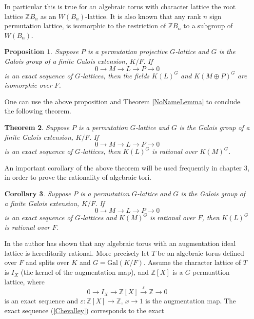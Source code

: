 \documentclass[a4paper, 14pt]{extarticle}
\theoremstyle{plain}
\newtheorem{theorem}{Theorem}
\newtheorem{corollary}[theorem]{Corollary}
\newtheorem{proposition}[theorem]{Proposition}
\theoremstyle{definition}
\newcommand{\Z}{\ensuremath{\mathbb{Z}}}
\begin{document}
In particular this is true for an algebraic torus with character lattice the root 
lattice $\Z B_n$ as an $W(B_n)$-lattice. It is also known that any rank $n$ sign 
permutation lattice, is isomorphic to the restriction of $\Z B_n$ to a subgroup 
of $W(B_n)$. 
\begin{proposition}\cite[Proposition 1.5]{Lenstra}
Suppose $P$ is a permutation projective $G$-lattice and $G$ is the Galois group 
of a finite Galois extension, $K/F$. If 
$$0 \longrightarrow M \longrightarrow L \longrightarrow P \longrightarrow 0 $$ is 
an exact sequence of $G$-lattices, then the fields $K(L)^G$ and $K(M \oplus P)^G$ are isomorphic over $F$. 
\end{proposition}
\noindent
One can use the above proposition and Theorem \ref{NoNameLemma} to conclude the 
following theorem.
\begin{theorem}\cite[Proposition 1.6]{Lenstra}\label{method2}
Suppose $P$ is a permutation $G$-lattice and $G$ is the Galois group of a finite 
Galois extension, $K/F$.  If 
$$0 \longrightarrow M \longrightarrow L \longrightarrow P \longrightarrow 0 $$ is 
an exact sequence of $G$-lattices, then $K(L)^G$ is rational over $K(M)^G$.
\end{theorem}
\noindent
An important corollary of the above theorem will be used frequently in chapter 3, 
in order to prove the rationality of algebraic tori.
\begin{corollary}\label{permcoker}
Suppose $P$ is a permutation $G$-lattice and $G$ is the Galois group of a finite 
Galois extension, $K/F$.  If $$0 \longrightarrow M \longrightarrow L \longrightarrow P \longrightarrow 0 $$ 
is an exact sequence of $G$-lattices and $K(M)^G$ is rational over $F$, then $K(L)^G$ is rational over $F$.
\end{corollary}
\noindent
In \cite[Section 2.4.8]{Voskresenskii} the author has shown that any algebraic 
torus with an augmentation ideal lattice is hereditarily rational. More precisely 
let $T$ be an algebraic torus defined over $F$ and splits over $K$ and $G = \mathrm{Gal}(K/F)$. 
Assume the character lattice of $T$ is $I_X$ (the kernel of the augmentation map), 
and $\Z [X]$ is a $G$-permuattion lattice, where 
\begin{equation}\label{Chevalley}
0 \longrightarrow I_X \longrightarrow \Z [X] \overset{\varepsilon} \longrightarrow  \Z \longrightarrow 0
\end{equation}
is an exact sequence and $\varepsilon : \Z [X]  \rightarrow \Z $, $x \rightarrow 1$ 
is the augmentation map. The exact sequence (\ref{Chevalley}) corresponds to the exact 
\end{document}
